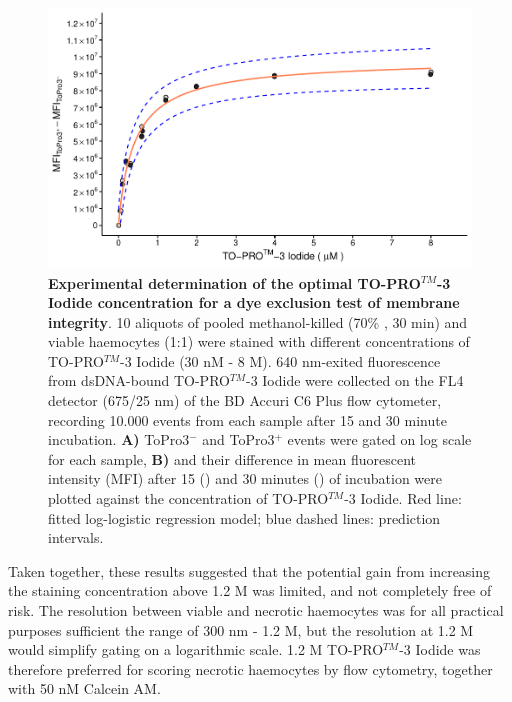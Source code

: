 \begin{figure}[h]
    \centering
    \includegraphics[width=1.0\textwidth]{figures/Method development/ToPro3 LL4.pdf}
    \caption{\textbf{Experimental determination of the optimal TO-PRO$^{TM}$-3 Iodide concentration for a dye exclusion test of membrane integrity}. 10 aliquots of pooled methanol-killed (70\% , 30 min) and viable haemocytes (1:1) were stained with different concentrations of TO-PRO$^{TM}$-3 Iodide (30 nM - 8 \micro M). 640 nm-exited fluorescence from dsDNA-bound TO-PRO$^{TM}$-3 Iodide were collected on the FL4 detector (675/25 nm) of the BD Accuri C6 Plus flow cytometer, recording 10.000 events from each sample after 15 and 30 minute incubation. \textbf{A)} ToPro3$^{-}$ and ToPro3$^{+}$ events were gated on log scale for each sample, \textbf{B)} and their difference in mean fluorescent intensity (MFI) after 15 (\protect\lysegraacircle) and 30 minutes (\protect\darkgraycircle) of incubation were plotted against the concentration of TO-PRO$^{TM}$-3 Iodide. Red line: fitted log-logistic regression model; blue dashed lines: prediction intervals.}
    \label{fig:ToPro3_stain_opt}
\end{figure}

Taken together, these results suggested that the potential gain from increasing the staining concentration above 1.2 \micro M was limited, and not completely free of risk. The resolution between viable and necrotic haemocytes was for all practical purposes sufficient the range of 300 nm - 1.2 \micro M, but the resolution at 1.2 \micro M would simplify gating on a logarithmic scale. 1.2 \micro M TO-PRO$^{TM}$-3 Iodide was therefore preferred for scoring necrotic haemocytes by flow cytometry, together with 50 nM Calcein AM.

